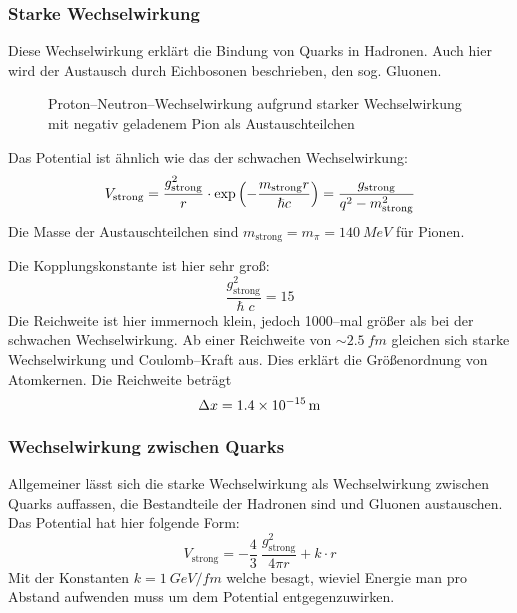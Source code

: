 \documentclass[Ex4_Zusammenfassung.tex]{subfiles}
\begin{document}
\subsubsection{Starke Wechselwirkung}
Diese Wechselwirkung erklärt die Bindung von Quarks in Hadronen. Auch hier wird der Austausch durch Eichbosonen beschrieben, den sog. Gluonen. 
\begin{figure}[H]
	\centering
	\caption{Proton--Neutron--Wechselwirkung aufgrund starker Wechselwirkung mit negativ geladenem Pion als Austauschteilchen}
\end{figure}
Das Potential ist ähnlich wie das der schwachen Wechselwirkung:
\begin{equation}
	V_{\text{strong}} = \frac{g_{\text{strong}}^2}{r} \cdot \exp\left( -\frac{m_{\text{strong}} r}{\hslash c}\right) = \frac{g_{\text{strong}}}{q^2 - m_{\text{strong}}^2}
\end{equation}
Die Masse der Austauschteilchen sind  $ m_{\text{strong}} = m_{\pi} = \SI{140}{MeV}$ für Pionen. 

Die Kopplungskonstante ist hier sehr groß:
\begin{equation}
	\frac{g_{\text{strong}}^2}{\hslash c } = 15 
\end{equation}
Die Reichweite ist hier immernoch klein, jedoch 1000--mal größer als bei der schwachen Wechselwirkung. Ab einer Reichweite von $ \sim \SI{2.5}{fm}$ gleichen sich starke Wechselwirkung und Coulomb--Kraft aus. Dies erklärt die Größenordnung von Atomkernen. Die Reichweite beträgt 
\begin{equation}
	\Delta x = \SI{1.4E-15}{m}
\end{equation}

\subsubsection{Wechselwirkung zwischen Quarks}
Allgemeiner lässt sich die starke Wechselwirkung als Wechselwirkung zwischen Quarks auffassen, die Bestandteile der Hadronen sind und Gluonen austauschen. Das Potential hat hier folgende Form: 
\begin{equation}
	V_{\text{strong}} = - \frac{4}{3} \  \frac{g_{\text{strong}}^2}{4 \pi r} + k \cdot r 
\end{equation}
Mit der Konstanten $ k = \SI{1}{GeV/fm} $ welche besagt, wieviel Energie man pro Abstand aufwenden muss um dem Potential entgegenzuwirken. 
\end{document}
